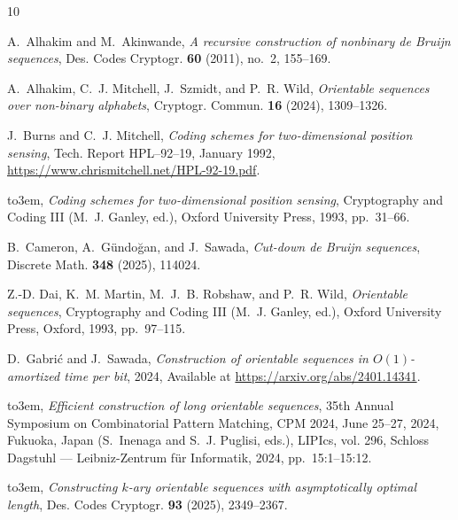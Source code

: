 \documentclass[a4paper,11pt]{article}
\theoremstyle{plain}
\theoremstyle{definition}
\theoremstyle{remark}
\begin{document}
\providecommand{\bysame}{\leavevmode\hbox to3em{\hrulefill}\thinspace}
\providecommand{\MR}{\relax\ifhmode\unskip\space\fi MR }
\providecommand{\MRhref}[2]{%
  \href{http://www.ams.org/mathscinet-getitem?mr=#1}{#2}
} \providecommand{\href}[2]{#2}
\begin{thebibliography}{10}

 A.~Alhakim and M.~Akinwande, \emph{A recursive construction of nonbinary de
  {Bruijn} sequences}, Des. Codes Cryptogr. \textbf{60} (2011), no.~2,
  155--169.

 A.~Alhakim, C.~J. Mitchell, J.~Szmidt, and P.~R. Wild, \emph{Orientable
  sequences over non-binary alphabets}, Cryptogr. Commun. \textbf{16} (2024),
  1309--1326.

 J.~Burns and C.~J. Mitchell, \emph{Coding schemes for two-dimensional
    position
  sensing}, Tech. Report HPL--92--19, January 1992,
  \url{https://www.chrismitchell.net/HPL-92-19.pdf}.

 \bysame, \emph{Coding schemes for two-dimensional position sensing},
  Cryptography and Coding III (M.~J. Ganley, ed.), Oxford University Press,
  1993, pp.~31--66.

 B.~Cameron, A.~G{\"u}ndo{\u g}an, and J.~Sawada, \emph{Cut-down de {Bruijn}
  sequences}, Discrete Math. \textbf{348} (2025), 114024.

 Z.-D. Dai, K.~M. Martin, M.~J.~B. Robshaw, and P.~R. Wild, \emph{Orientable
  sequences}, Cryptography and Coding III (M.~J. Ganley, ed.), Oxford
  University Press, Oxford, 1993, pp.~97--115.

 D.~Gabri{\'c} and J.~Sawada, \emph{Construction of orientable sequences in
  {$O(1)$-amortized} time per bit}, 2024, Available at
  \url{https://arxiv.org/abs/2401.14341}.

 \bysame, \emph{Efficient construction of long orientable sequences}, 35th
  Annual Symposium on Combinatorial Pattern Matching, {CPM} 2024, June 25--27,
  2024, Fukuoka, Japan (S.~Inenaga and S.~J. Puglisi, eds.), LIPIcs, vol. 296,
  Schloss Dagstuhl --- Leibniz-Zentrum f{\"{u}}r Informatik, 2024,
  pp.~15:1--15:12.

 \bysame, \emph{Constructing $k$-ary orientable sequences with asymptotically
  optimal length}, Des. Codes Cryptogr. \textbf{93} (2025), 2349--2367.


\end{thebibliography}
\end{document}
